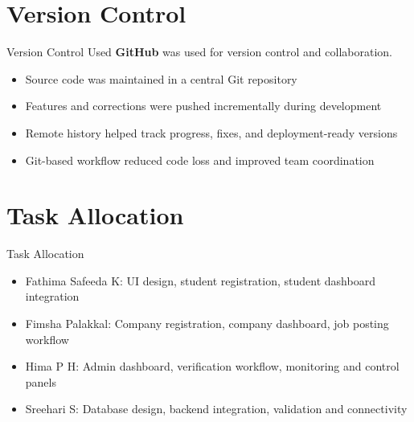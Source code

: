 \documentclass{beamer}
\begin{document}
\section{Version Control}
\begin{frame}{Version Control Used}
\justifying
\textbf{GitHub} was used for version control and collaboration.

\begin{itemize}
\item Source code was maintained in a central Git repository
\item Features and corrections were pushed incrementally during development
\item Remote history helped track progress, fixes, and deployment-ready versions
\item Git-based workflow reduced code loss and improved team coordination
\end{itemize}
\end{frame}

\section{Task Allocation}
\begin{frame}{Task Allocation}
\begin{itemize}
\item Fathima Safeeda K: UI design, student registration, student dashboard integration
\item Fimsha Palakkal: Company registration, company dashboard, job posting workflow
\item Hima P H: Admin dashboard, verification workflow, monitoring and control panels
\item Sreehari S: Database design, backend integration, validation and connectivity
\end{itemize}
\end{frame}
\end{document}
